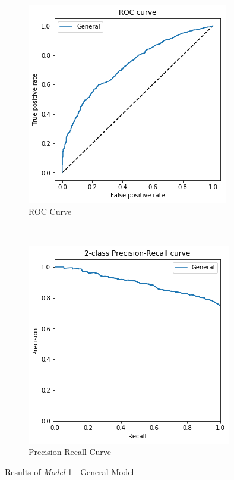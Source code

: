 \begin{figure}[t]
    \centering
    \begin{subfigure}{0.5\textwidth}
        \centering
        \includegraphics[width=\textwidth]{Figures/ROC_gen.png}
        \caption{ROC Curve}
    \end{subfigure}%
    ~ 
    \begin{subfigure}{0.5\textwidth}
        \centering        
        \includegraphics[width=\textwidth]{Figures/PR_gen.png}
        \caption{Precision-Recall Curve}
    \end{subfigure}
    \caption{Results of \emph{Model} 1 - General Model}
    \label{ROC:general}
\end{figure}

